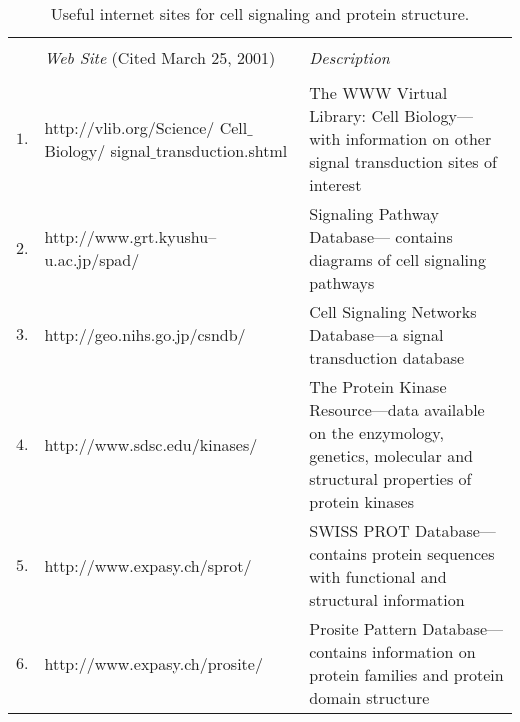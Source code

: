 \vspace{0.5in}
\renewcommand{\baselinestretch}{0.8} %
{\ssp
\begin{table}[htbp]

\caption{Useful internet sites for cell signaling and protein structure.}
\label{table:WEBSITES}

\begin{center}
	\begin{tabular}
	{|p{0.2in}|
	p{2.5in}|
	p{2.7in}|} \hline 
		\rule{0pt}{1pt} & & \\
			~ & 
			\PBS\raggedright{{\em Web Site} (Cited March 25, 2001)} & 
			\PBS\raggedright{\em Description}  \vspace{1mm} \\ \hline
		\rule{0pt}{1pt} & & \\ 
			$1.$ & 
			\PBS\raggedright{http://vlib.org/Science/ Cell$\_$Biology/ signal$\_$transduction.shtml} &
			\PBS\raggedright{The WWW Virtual Library: Cell Biology---with 
				information on other signal transduction sites of interest} \vspace{1mm}\\
			$2.$ &
			\PBS\raggedright{http://www.grt.kyushu--u.ac.jp/spad/}  &
			\PBS\raggedright{Signaling Pathway Database--- contains diagrams of cell signaling pathways}  \vspace{1mm} \\
			$3.$ &
			\PBS\raggedright{http://geo.nihs.go.jp/csndb/} &  
			\PBS\raggedright{Cell Signaling Networks Database---a signal transduction database \cite{CSND:1999}} \vspace{1mm} \\
			$4.$ &
			\PBS\raggedright{http://www.sdsc.edu/kinases/} &
			\PBS\raggedright{The Protein Kinase Resource---data available on the enzymology, 
				genetics, molecular and structural properties of protein kinases \cite{PKR:1997}} \vspace{1mm}\\
			$5.$ &
			\PBS\raggedright{http://www.expasy.ch/sprot/}  & 
			\PBS\raggedright{SWISS PROT Database---contains protein 
				sequences with functional and structural information \cite{BAIROCH:2000}} \vspace{1mm} \\
			$6.$ &
			\PBS\raggedright{http://www.expasy.ch/prosite/} & 
			\PBS\raggedright{Prosite Pattern Database---contains 
				information on protein families and protein domain structure \cite{HOFMANN:1999}} \vspace{1mm}\\

\end{tabular}
\end{center}
\end{table}}
